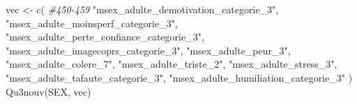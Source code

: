 \documentclass[
]{article}
\newenvironment{Shaded}{\begin{snugshade}}{\end{snugshade}}
\newcommand{\CommentTok}[1]{\textcolor[rgb]{0.56,0.35,0.01}{\textit{#1}}}
\newcommand{\FunctionTok}[1]{\textcolor[rgb]{0.00,0.00,0.00}{#1}}
\newcommand{\NormalTok}[1]{#1}
\newcommand{\OtherTok}[1]{\textcolor[rgb]{0.56,0.35,0.01}{#1}}
\newcommand{\StringTok}[1]{\textcolor[rgb]{0.31,0.60,0.02}{#1}}
\begin{document}
\begin{Shaded}
\begin{Highlighting}[]
\NormalTok{vec }\OtherTok{\textless{}{-}} \FunctionTok{c}\NormalTok{(  }\CommentTok{\#450{-}459}
  \StringTok{"msex\_adulte\_demotivation\_categorie\_3"}\NormalTok{,}
  \StringTok{"msex\_adulte\_moinsperf\_categorie\_3"}\NormalTok{,}
  \StringTok{"msex\_adulte\_perte\_confiance\_categorie\_3"}\NormalTok{,}
  \StringTok{"msex\_adulte\_imagecoprs\_categorie\_3"}\NormalTok{,}
  \StringTok{"msex\_adulte\_peur\_3"}\NormalTok{,}
  \StringTok{"msex\_adulte\_colere\_7"}\NormalTok{,}
  \StringTok{"msex\_adulte\_triste\_2"}\NormalTok{,}
  \StringTok{"msex\_adulte\_stress\_3"}\NormalTok{,}
  \StringTok{"msex\_adulte\_tafaute\_categorie\_3"}\NormalTok{,}
  \StringTok{"msex\_adulte\_humiliation\_categorie\_3"}
\NormalTok{  )      }
\FunctionTok{Qu3nouv}\NormalTok{(SEX, vec)}
\end{Highlighting}
\end{Shaded}
\end{document}
